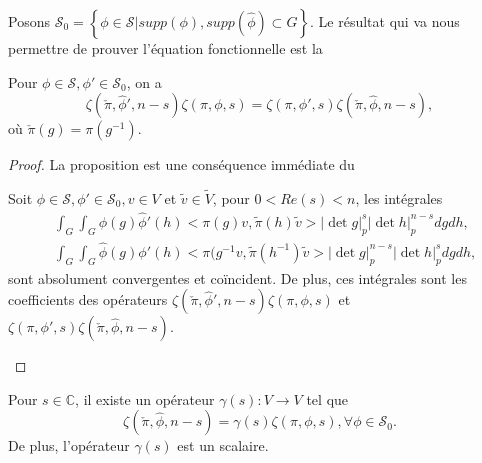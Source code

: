 Posons $\mathcal{S}_0=\left\lbrace \phi \in \mathcal{S}| supp(\phi), supp(\hat{\phi}) \subset G \right\rbrace$. Le résultat qui va nous permettre de prouver l'équation fonctionnelle est la
\begin{proposition}
\label{pre-eq-func}
Pour $\phi \in \mathcal{S}, \phi' \in \mathcal{S}_0$, on a
\begin{equation}
\zeta(\check{\pi}, \hat{\phi}', n-s)\zeta(\pi,\phi,s) = \zeta(\pi, \phi',s)\zeta(\check{\pi}, \hat{\phi}, n-s),
\end{equation}
où $\check{\pi}(g) = \pi(g^{-1})$.
\end{proposition}

\begin{proof}
La proposition est une conséquence immédiate du
\begin{lemme}
Soit $\phi \in \mathcal{S}, \phi' \in \mathcal{S}_0, v \in V$ et $\tilde{v} \in \tilde{V}$, pour $0 < Re(s) < n$, les intégrales
\begin{align}
&\int_G \int_G \phi(g)\hat{\phi}'(h)<\pi(g)v,\tilde{\pi}(h)\tilde{v}>|\det g|_p^s|\det h|_p^{n-s}dg dh, \\
&\int_G \int_G \hat{\phi}(g)\phi'(h)<\pi(g^{-1}v,\tilde{\pi}(h^{-1})\tilde{v}>|\det g|_p^{n-s}|\det h|_p^s dg dh,
\end{align}
sont absolument convergentes et coïncident. De plus, ces intégrales sont les coefficients des opérateurs $\zeta(\check{\pi}, \hat{\phi}', n-s)\zeta(\pi,\phi,s)$ et $\zeta(\pi, \phi',s)\zeta(\check{\pi}, \hat{\phi}, n-s)$.
\end{lemme}

\end{proof}

\begin{proposition}
Pour $s \in \mathbb{C}$, il existe un opérateur $\gamma(s) : V \rightarrow V$ tel que
\begin{equation}
\zeta(\check{\pi}, \hat{\phi}, n-s) = \gamma(s)\zeta(\pi,\phi,s), \forall \phi \in \mathcal{S}_0.
\end{equation}
De plus, l'opérateur $\gamma(s)$ est un scalaire.
\end{proposition}

